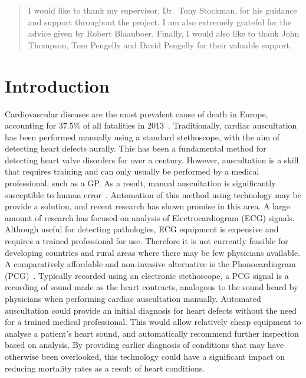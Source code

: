 \documentclass[titlepage, 12pt]{scrartcl} \usepackage{enumitem}
\begin{document}
\renewcommand{\abstractname}{Acknowledgements}
\begin{abstract}
I would like to thank my supervisor, Dr.\ Tony Stockman, for his guidance and
support throughout the project. I am also extremely grateful for the advice
given by Robert Blaauboer. Finally, I would also like to thank John Thompson,
Tom Pengelly and David Pengelly for their valuable support.
\end{abstract}

\tableofcontents
\newpage

\section{Introduction}
Cardiovascular diseases are the most prevalent cause of death in Europe,
accounting for 37.5\% of all fatalities in 2013~\parencite{Eurostat2016}.
Traditionally, cardiac auscultation has been performed manually using a standard
stethoscope, with the aim of detecting heart defects aurally. This has been a
fundamental method for detecting heart valve disorders for over a century.
However, auscultation is a skill that requires training and can only usually be
performed by a medical professional, such as a GP. As a result, manual
auscultation is significantly susceptible to human error~\parencite{Hanna2002}.
Automation of this method using technology may be provide a solution, and
recent research has shown promise in this area. A large amount of research has
focused on analysis of Electrocardiogram (ECG) signals.  Although useful for
detecting pathologies, ECG equipment is expensive and requires a trained
professional for use. Therefore it is not currently feasible for developing
countries and rural areas where there may be few physicians available. A
comparatively affordable and non-invasive alternative is the Phonocardiogram
(PCG)~\parencite[p.130]{Reed2004}. Typically recorded using an electronic
stethoscope, a PCG signal is a recording of sound made as the heart contracts,
analogous to the sound heard by physicians when performing cardiac auscultation
manually. Automated auscultation could provide an initial diagnosis for heart
defects without the need for a trained medical professional. This would allow
relatively cheap equipment to analyse a patient's heart sound, and
automatically recommend further inspection based on analysis.  By providing
earlier diagnosis of conditions that may have otherwise been overlooked, this
technology could have a significant impact on reducing mortality rates as a
result of heart conditions.
\end{document}
